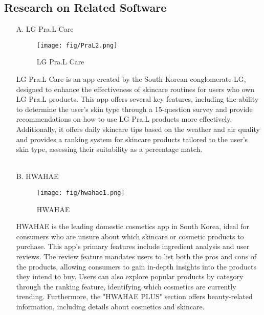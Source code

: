 \documentclass[conference]{IEEEtran}
\begin{document}
\subsection{Research on Related Software}\label{SCM}
\begin{enumerate}
    \item[A.] LG Pra.L Care
    \begin{figure} [h]
    \texttt{[image: fig/PraL2.png]}
    \caption{LG Pra.L Care}
    \end{figure}
\item[] LG Pra.L Care is an app created by the South Korean conglomerate LG, designed to enhance the effectiveness of skincare routines for users who own LG Pra.L products. This app offers several key features, including the ability to determine the user's skin type through a 15-question survey and provide recommendations on how to use LG Pra.L products more effectively. Additionally, it offers daily skincare tips based on the weather and air quality and provides a ranking system for skincare products tailored to the user's skin type, assessing their suitability as a percentage match.
\\
\\


\item[B.] HWAHAE
\begin{figure} [h]
    \texttt{[image: fig/hwahae1.png]}
    \caption{HWAHAE}
\end{figure}
\item[] HWAHAE is the leading domestic cosmetics app in South Korea, ideal for consumers who are unsure about which skincare or cosmetic products to purchase. This app's primary features include ingredient analysis and user reviews. The review feature mandates users to list both the pros and cons of the products, allowing consumers to gain in-depth insights into the products they intend to buy. Users can also explore popular products by category through the ranking feature, identifying which cosmetics are currently trending. Furthermore, the "HWAHAE PLUS" section offers beauty-related information, including details about cosmetics and skincare.
\\


\end{enumerate}
\end{document}
